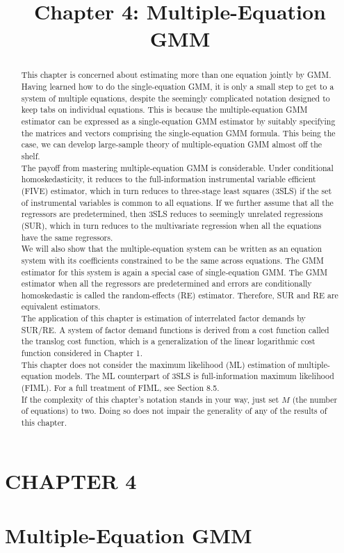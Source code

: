 \documentclass[10pt]{article}
\title{Chapter 4: Multiple-Equation GMM}
\author{}
\date{}
\begin{document}
\maketitle

\section*{CHAPTER 4}
\section*{Multiple-Equation GMM}
\begin{abstract}
This chapter is concerned about estimating more than one equation jointly by GMM. Having learned how to do the single-equation GMM, it is only a small step to get to a system of multiple equations, despite the seemingly complicated notation designed to keep tabs on individual equations. This is because the multiple-equation GMM estimator can be expressed as a single-equation GMM estimator by suitably specifying the matrices and vectors comprising the single-equation GMM formula. This being the case, we can develop large-sample theory of multiple-equation GMM almost off the shelf.\\
The payoff from mastering multiple-equation GMM is considerable. Under conditional homoskedasticity, it reduces to the full-information instrumental variable efficient (FIVE) estimator, which in turn reduces to three-stage least squares (3SLS) if the set of instrumental variables is common to all equations. If we further assume that all the regressors are predetermined, then 3SLS reduces to seemingly unrelated regressions (SUR), which in turn reduces to the multivariate regression when all the equations have the same regressors.\\
We will also show that the multiple-equation system can be written as an equation system with its coefficients constrained to be the same across equations. The GMM estimator for this system is again a special case of single-equation GMM. The GMM estimator when all the regressors are predetermined and errors are conditionally homoskedastic is called the random-effects (RE) estimator. Therefore, SUR and RE are equivalent estimators.\\
The application of this chapter is estimation of interrelated factor demands by SUR/RE. A system of factor demand functions is derived from a cost function called the translog cost function, which is a generalization of the linear logarithmic cost function considered in Chapter 1.\\
This chapter does not consider the maximum likelihood (ML) estimation of multiple-equation models. The ML counterpart of 3SLS is full-information maximum likelihood (FIML). For a full treatment of FIML, see Section 8.5.\\
If the complexity of this chapter's notation stands in your way, just set $M$ (the number of equations) to two. Doing so does not impair the generality of any of the results of this chapter.
\end{abstract}
\end{document}
